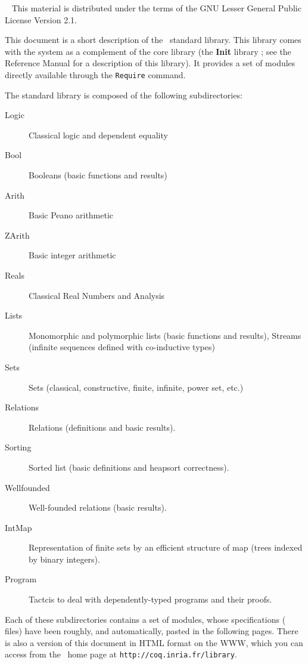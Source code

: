 \documentclass[11pt]{report}
\begin{document}
 
%
{\ }
{This material is distributed under the terms of the GNU Lesser
General Public License Version 2.1.}

\tableofcontents

\newpage

This document is a short description of the \Coq\ standard library.
This library comes with the system as a complement of the core library
(the {\bf Init} library ; see the Reference Manual for a description
of this library). It provides a set of modules directly available
through the \verb!Require! command.

The standard library is composed of the following subdirectories:
\begin{description}
  \item[Logic]  Classical logic and dependent equality
  \item[Bool]   Booleans (basic functions and results)
  \item[Arith]  Basic Peano arithmetic
  \item[ZArith] Basic integer arithmetic
  \item[Reals]  Classical Real Numbers and Analysis
  \item[Lists]  Monomorphic and polymorphic lists (basic functions and
                  results), Streams (infinite sequences defined 
                  with co-inductive types)
  \item[Sets]   Sets (classical, constructive, finite, infinite, power set,
                  etc.)
  \item[Relations] Relations (definitions and basic results).
  \item[Sorting] Sorted list (basic definitions and heapsort
                 correctness). 
  \item[Wellfounded] Well-founded relations (basic results).
  \item[IntMap]       Representation of finite sets by an efficient
                     structure of map (trees indexed by binary integers).
  \item[Program] Tactcis to deal with dependently-typed programs and
    their proofs.
\end{description}


Each of these subdirectories contains a set of modules, whose
specifications (\gallina{} files) have
been roughly, and automatically, pasted in the following pages. There
is also a version of this document in HTML format on the WWW, which
you can access from the \Coq\ home page at
\texttt{http://coq.inria.fr/library}.


\end{document}
